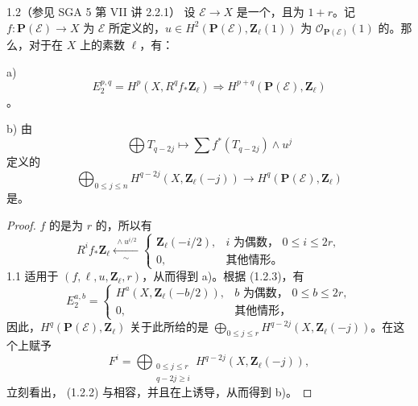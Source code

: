 \begin{SGAresult}{}{1.2（参见 SGA 5 第 VII 讲 2.2.1）}
设 $\mathscr E\to X$ 是一个，且为 $1+r$。记 $f:\mathbf P(\mathscr E)\to X$ 为 $\mathscr E$ 所定义的，$u\in H^2(\mathbf P(\mathscr E),\mathbf Z_\ell(1))$ 为 $\mathscr O_{\mathbf P(\mathscr E)}(1)$ 的。那么，对于在 $X$ 上的素数 $\ell$，有：

\textup{a)} 
\[
 E_2^{p,q}=H^p(X,R^qf_*\mathbf Z_\ell)\Longrightarrow H^{p+q}(\mathbf P(\mathscr E),\mathbf Z_\ell)\tag{1.2.1}
\]
。

\textup{b)} 由
\[
 \bigoplus T_{q-2j}\longmapsto \sum f^*(T_{q-2j})\wedge u^j
\]
定义的
\[
 \bigoplus_{0\leq j\leq n}H^{q-2j}(X,\mathbf Z_\ell(-j))\longrightarrow H^q(\mathbf P(\mathscr E),\mathbf Z_\ell)\tag{1.2.2}
\]
是。
\end{SGAresult}
\begin{proof}
$f$ 的是为 $r$ 的，所以有
\[
 R^if_*\mathbf Z_\ell\xleftarrow[\sim]{\ \wedge u^{i/2}\ }
 \begin{cases}\mathbf Z_\ell(-i/2),&i\text{ 为偶数， }0\leq i\leq 2r,\\0,&\text{其他情形。}\end{cases}\tag{1.2.3}
\]
 1.1 适用于 $(f,\ell,u,\mathbf Z_\ell,r)$，从而得到 a)。根据 (1.2.3)，有
\[
 E_2^{a,b}=\begin{cases}H^a(X,\mathbf Z_\ell(-b/2)),&b\text{ 为偶数， }0\leq b\leq 2r,\\0,&\text{其他情形，}\end{cases}\tag{1.2.4}
\]
因此，$H^q(\mathbf P(\mathscr E),\mathbf Z_\ell)$ 关于此所给的是 $\bigoplus_{0\leq j\leq r}H^{q-2j}(X,\mathbf Z_\ell(-j))$。在这个上赋予
\[
 F^i=\bigoplus_{\substack{0\leq j\leq r\\q-2j\geq i}}H^{q-2j}(X,\mathbf Z_\ell(-j)),
\]
立刻看出， (1.2.2) 与相容，并且在上诱导，从而得到 b)。
\end{proof}

